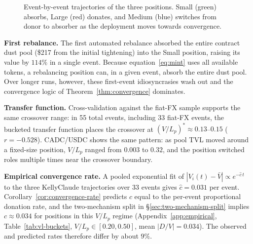 \documentclass{manuscript}
\begin{document}
\begin{figure}[H]
\caption{Event-by-event trajectories of the three positions. Small (green) absorbs, Large (red) donates, and Medium (blue) switches from donor to absorber as the deployment moves towards convergence.}
\label{fig:vl-sweep}
\end{figure}

\textbf{First rebalance.} The first automated rebalance absorbed the entire contract dust pool (\$217 from the initial tightening) into the Small position, raising its value by $114\%$ in a single event. Because equation~\eqref{eq:mint} uses all available tokens, a rebalancing position can, in a given event, absorb the entire dust pool. Over longer runs, however, these first-event idiosyncrasies wash out and the convergence logic of Theorem~\ref{thm:convergence} dominates.

\textbf{Transfer function.} Cross-validation against the fiat-FX sample supports the same crossover range: in 55 total events, including 33 fiat-FX events, the bucketed transfer function places the crossover at $(V/L_p)^* \approx 0.13$--$0.15$ ($r = -0.528$). CADC/USDC shows the same pattern: as pool TVL moved around a fixed-size position, $V/L_p$ ranged from $0.003$ to $0.32$, and the position switched roles multiple times near the crossover boundary.

\textbf{Empirical convergence rate.} A pooled exponential fit of $|V_i(t) - \bar V| \propto e^{-\hat c\, t}$ to the three KellyClaude trajectories over 33 events gives $\hat c = 0.031$ per event. Corollary~\ref{cor:convergence-rate} predicts $c$ equal to the per-event proportional donation rate, and the two-mechanism split in \S\ref{sec:two-mechanism-split} implies $c \approx 0.034$ for positions in this $V/L_p$ regime (Appendix~\ref{app:empirical}, Table~\ref{tab:vl-buckets}, $V/L_p \in [0.20, 0.50]$, mean $|D/V| = 0.034$). The observed and predicted rates therefore differ by about $9\%$.
\end{document}
